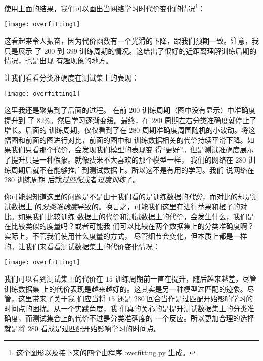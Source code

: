 使用上面的结果，我们可以画出当网络学习时代价变化的情况\footnote{这个图形以及接下来的四个由程序 \href{https://github.com/mnielsen/neural-networks-and-deep-learning/blob/master/fig/overfitting.py}{overfitting.py} 生成。}：
\begin{center}
  \texttt{[image: overfitting1]}
\end{center}
  
这看起来令人振奋，因为代价函数有一个光滑的下降，跟我们预期一致。注意，我只是展示
了 $200$ 到 $399$ 训练周期的情况。这给出了很好的近距离理解训练后期的情况，也是出现
有趣现象的地方。

让我们看看分类准确度在测试集上的表现：
\begin{center}
  \texttt{[image: overfitting1]}  %
\end{center}

这里我还是聚焦到了后面的过程。 在前 $200$ 训练周期（图中没有显示）中准确度提升到
了 82\%。然后学习逐渐变缓。最终，在 $280$ 周期左右分类准确度就停止了增长。后面的
训练周期，仅仅看到了在 $280$ 周期准确度周围随机的小波动。将这幅图和前面的图进行对比，前面的图中和
训练数据相关的代价持续平滑下降。如果我们只看那个代价，会发现我们模型的表现变
得``更好''。但是测试准确度展示了提升只是一种假象。就像费米不大喜欢的那个模型一样，
我们的网络在 $280$ 训练周期后就不在能够推广到测试数据上。所以这不是有用的学习。我们
说网络在 $280$ 训练周期 后就\emph{过匹配}或者\emph{过度训练}了。

你可能想知道这里的问题是不是由于我们看的是训练数据的\emph{代价}，而对比的却是测试数据上
的\emph{分类准确度}导致的。换言之，可能我们这里在进行苹果和橙子的对比。如果我们比较训练
数据上的代价和测试数据上的代价，会发生什么，我们是在比较类似的度量吗？或者可能我
们可以比较在两个数据集上的分类准确度啊？实际上，不管我们使用什么度量的方式，
尽管细节会变化，但本质上都是一样的。让我们来看看测试数据集上的代价变化情况：
\begin{center}
  \texttt{[image: overfitting1]}  %
\end{center}

我们可以看到测试集上的代价在 $15$ 训练周期前一直在提升，随后越来越差，尽管训练数据集
上的代价表现是越来越好的。这其实是另一种模型过匹配的迹象。尽管，这里带来了关于我
们应当将 $15$ 还是 $280$ 回合当作是过匹配开始影响学习的时间点的困扰。从一个实践角度，我
们真的关心的是提升测试数据集上的分类准确度，而测试集合上的代价不过是分类准确度的
一个反应。所以更加合理的选择就是将 $280$ 看成是过匹配开始影响学习的时间点。

